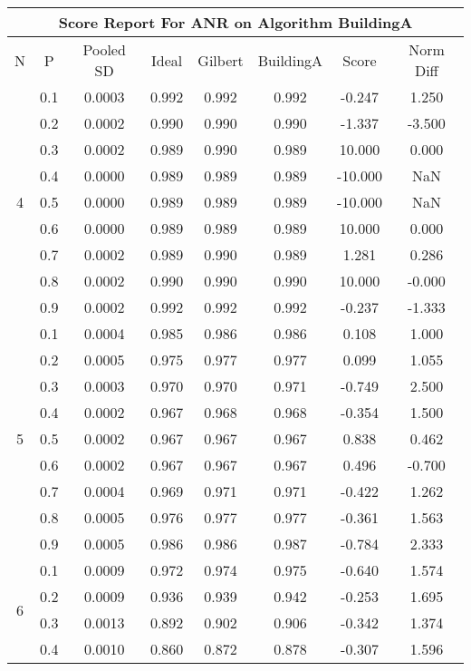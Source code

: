 \documentclass[11pt,a4paper]{report}
\begin{document}
\begin{longtable}{ | c | c || c | c | c | c | c | c | }
\hline
\multicolumn{8}{|c|}{ Score Report For ANR on Algorithm BuildingA} \\
\hline
N & P & Pooled SD &  Ideal &  Gilbert & BuildingA  & Score & Norm Diff \\
 \hline
 \hline
 \endhead
\multirow{9}{*}{4} & 0.1 & 0.0003 & 0.992 & 0.992 & 0.992 & -0.247 & 1.250 \\
 & 0.2 & 0.0002 & 0.990 & 0.990 & 0.990 & -1.337 & -3.500 \\
 & 0.3 & 0.0002 & 0.989 & 0.990 & 0.989 & 10.000 & 0.000 \\
 & 0.4 & 0.0000 & 0.989 & 0.989 & 0.989 & -10.000 & NaN \\
 & 0.5 & 0.0000 & 0.989 & 0.989 & 0.989 & -10.000 & NaN \\
 & 0.6 & 0.0000 & 0.989 & 0.989 & 0.989 & 10.000 & 0.000 \\
 & 0.7 & 0.0002 & 0.989 & 0.990 & 0.989 & 1.281 & 0.286 \\
 & 0.8 & 0.0002 & 0.990 & 0.990 & 0.990 & 10.000 & -0.000 \\
 & 0.9 & 0.0002 & 0.992 & 0.992 & 0.992 & -0.237 & -1.333 \\
 \hline
\multirow{9}{*}{5} & 0.1 & 0.0004 & 0.985 & 0.986 & 0.986 & 0.108 & 1.000 \\
 & 0.2 & 0.0005 & 0.975 & 0.977 & 0.977 & 0.099 & 1.055 \\
 & 0.3 & 0.0003 & 0.970 & 0.970 & 0.971 & -0.749 & 2.500 \\
 & 0.4 & 0.0002 & 0.967 & 0.968 & 0.968 & -0.354 & 1.500 \\
 & 0.5 & 0.0002 & 0.967 & 0.967 & 0.967 & 0.838 & 0.462 \\
 & 0.6 & 0.0002 & 0.967 & 0.967 & 0.967 & 0.496 & -0.700 \\
 & 0.7 & 0.0004 & 0.969 & 0.971 & 0.971 & -0.422 & 1.262 \\
 & 0.8 & 0.0005 & 0.976 & 0.977 & 0.977 & -0.361 & 1.563 \\
 & 0.9 & 0.0005 & 0.986 & 0.986 & 0.987 & -0.784 & 2.333 \\
 \hline
\multirow{9}{*}{6} & 0.1 & 0.0009 & 0.972 & 0.974 & 0.975 & -0.640 & 1.574 \\
 & 0.2 & 0.0009 & 0.936 & 0.939 & 0.942 & -0.253 & 1.695 \\
 & 0.3 & 0.0013 & 0.892 & 0.902 & 0.906 & -0.342 & 1.374 \\
 & 0.4 & 0.0010 & 0.860 & 0.872 & 0.878 & -0.307 & 1.596 \\

\end{longtable}
\end{document}
